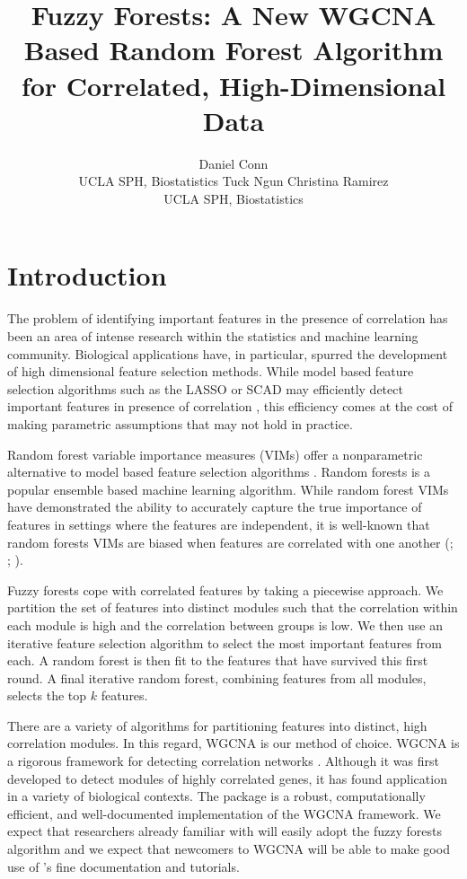 \documentclass[article,shortnames]{jss}
\author{Daniel Conn\\UCLA SPH, Biostatistics \And Tuck Ngun \And Christina Ramirez\\UCLA SPH, Biostatistics }
\title{Fuzzy Forests: A New WGCNA Based Random Forest Algorithm for Correlated, High-Dimensional Data}
\begin{document}

\section[Introduction]{Introduction}
The problem of identifying important features in the presence of correlation has been an area of intense research within the statistics
and machine learning community.  Biological applications have, in particular, spurred the development of high dimensional feature selection methods.   
While model based feature selection algorithms such as the LASSO or SCAD may efficiently detect important features in presence of correlation \citep{raskutti2010restricted}, this efficiency comes at the cost of making parametric assumptions that may not hold in practice. 
 
Random forest variable importance measures (VIMs) offer a nonparametric alternative to model based feature selection algorithms \citep{breiman2001random}.
Random forests is a popular ensemble based machine learning algorithm.  While random forest VIMs have demonstrated the ability to accurately capture the true 
importance of features in settings where the features are independent, it is well-known that random forests VIMs are biased when features are correlated
with one another (\cite{strobl2007bias}; \cite{strobl2008conditional}; \cite{nicodemus2009predictor}).

Fuzzy forests cope with correlated features by taking a piecewise approach.  We partition the set of features into distinct modules such that the correlation within each module is high and the correlation between groups is low.  We then use an iterative feature selection algorithm to select the most important
features from each.  A random forest is then fit to the features that have survived this first round.  A final iterative random forest,  combining features from all
modules, selects the top $k$ features. 

There are a variety of algorithms for partitioning features into distinct, high correlation modules.  In this regard, WGCNA is our method of choice.  WGCNA is a rigorous framework for detecting correlation networks \citep{zhang2005general}.  Although it was first developed to detect modules of highly correlated genes, it has found application in a variety of biological contexts.  The  package  is a robust, computationally efficient, and well-documented implementation of the WGCNA framework.  We expect that researchers already familiar with  will easily adopt the fuzzy forests algorithm and we expect that newcomers to WGCNA will be able to make good use of 's fine documentation and tutorials.
              
\end{document}
